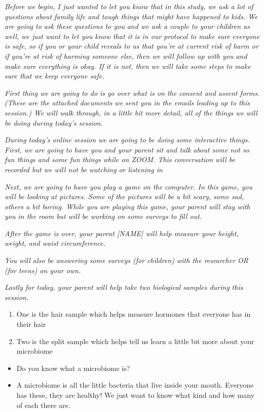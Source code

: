 \documentclass[]{book}
\providecommand{\tightlist}{%
  \setlength{\itemsep}{0pt}\setlength{\parskip}{0pt}}
\begin{document}
\emph{Before we begin, I just wanted to let you know that in this study, we ask a lot of questions about family life and tough things that might have happened to kids. We are going to ask these questions to you and we ask a couple to your children as well, we just want to let you know that it is in our protocol to make sure everyone is safe, so if you or your child reveals to us that you're at current risk of harm or if you're at risk of harming someone else, then we will follow up with you and make sure everything is okay. If it is not, then we will take some steps to make sure that we keep everyone safe.}

\emph{First thing we are going to do is go over what is on the consent and assent forms. (These are the attached documents we sent you in the emails leading up to this session.) We will walk through, in a little bit more detail, all of the things we will be doing during today's session.}

\emph{During today's online session we are going to be doing some interactive things. First, we are going to have you and your parent sit and talk about some not so fun things and some fun things while on ZOOM. This conversation will be recorded but we will not be watching or listening in}

\emph{Next, we are going to have you play a game on the computer. In this game, you will be looking at pictures. Some of the pictures will be a bit scary, some sad, others a bit boring. While you are playing this game, your parent will stay with you in the room but will be working on some surveys to fill out.}

\emph{After the game is over, your parent {[}NAME{]} will help measure your height, weight, and waist circumference.}

\emph{You will also be answering some surveys (for children) with the researcher OR (for teens) on your own.}

\emph{Lastly for today, your parent will help take two biological samples during this session.}

\begin{enumerate}
\def\labelenumi{\arabic{enumi}.}
\tightlist
\item
  One is the hair sample which helps measure hormones that everyone has in their hair
\item
  Two is the split sample which helps tell us learn a little bit more about your microbiome
\end{enumerate}

\begin{itemize}
\tightlist
\item
  Do you know what a microbiome is?
\item
  A microbiome is all the little bacteria that live inside your mouth. Everyone has these, they are healthy! We just want to know what kind and how many of each there are.
\end{itemize}
\end{document}
